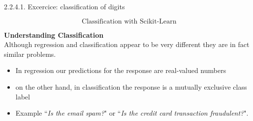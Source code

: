 2.2.4.1. Excercice: classification of digits\documentclass[MASTER.tex]{subfiles}
\begin{document}
%
%
%
%
%
%
%
%

	\huge
\[ \mbox{ Classification with Scikit-Learn} \]


\textbf{Understanding Classification}\\
Although regression and classification appear to be very different they are in fact similar problems.

\begin{itemize}
\item In regression our predictions for the response are real-valued numbers
\item on the other hand, in classification the response is a mutually exclusive class label 
\item Example ``\textit{Is the email spam?}" or ``\textit{Is the credit card transaction fraudulent?}".
\end{itemize}


\end{document}
